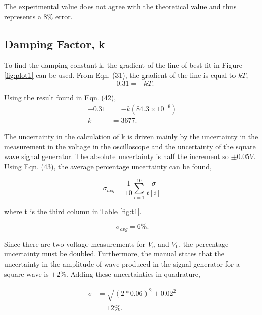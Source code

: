 \documentclass{article}
\begin{document}
The experimental value does not agree with the theoretical value and thus
represents a $8\%$ error.

\subsection{Damping Factor, k}
To find the damping constant k, the gradient of the line of best fit in 
Figure \ref{fig:plot1} can be used. From Eqn. (31), the gradient of the 
line is equal to $kT$,
\begin{equation}
    -0.31 = -kT. 
\end{equation}

Using the result found in Eqn. (42),
\begin{equation}
    \begin{split}
        -0.31 &= -k(84.3\times 10^{-6}) \\
        k &= 3677.
    \end{split}
\end{equation}

The uncertainty in the calculation of k is driven mainly by the uncertainty
in the measurement in the voltage in the oscilloscope and the uncertainty of
the square wave signal generator. The absolute uncertainty is half the increment 
so $\pm 0.05V$. Using Eqn. (43), the average percentage uncertainty can be found,

\begin{equation}
    \sigma_{avg} = \frac{1}{10}\sum_{i=1}^{10}\frac{\sigma}{t[i]}
\end{equation}

where t is the third column in Table \ref{fig:t1}.

\begin{equation}
    \sigma_{avg} = 6\%.
\end{equation}

Since there are two voltage measurements for $V_n$ and $V_0$, the percentage 
uncertainty must be doubled. Furthermore, the manual states that the uncertainty
in the amplitude of wave produced in the signal generator for a square wave is
$\pm 2 \%$. Adding these uncertainties in quadrature,

\begin{equation}
    \begin{split}
        \sigma &= \sqrt{(2*0.06)^2+0.02^2} \\
        &= 12\%.
    \end{split}
\end{equation}
\end{document}
